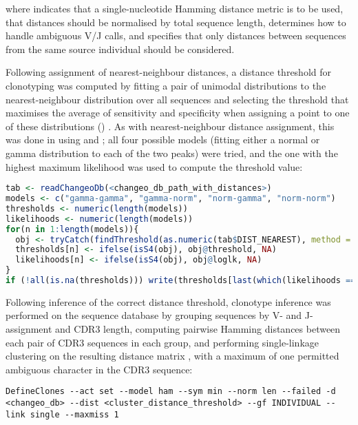 \noindent where  indicates that a single-nucleotide Hamming distance metric is to be used,  that distances should be normalised by total sequence length,  determines how to handle ambiguous V/J calls, and  specifies that only distances between sequences from the same source individual should be considered.

Following assignment of nearest-neighbour distances, a distance threshold for clonotyping was computed by fitting a pair of unimodal distributions to the nearest-neighbour distribution over all sequences and selecting the threshold that maximises the average of sensitivity and specificity when assigning a point to one of these distributions () \parencite{nouri2018threshold}. As with nearest-neighbour distance assignment, this was done in  using  and ; all four possible models (fitting either a normal or gamma distribution to each of the two peaks) were tried, and the one with the highest maximum likelihood was used to compute the threshold value:

\begin{lstlisting}[language=R]
tab <- readChangeoDb(<changeo_db_path_with_distances>)
models <- c("gamma-gamma", "gamma-norm", "norm-gamma", "norm-norm")
thresholds <- numeric(length(models))
likelihoods <- numeric(length(models))
for(n in 1:length(models)){
  obj <- tryCatch(findThreshold(as.numeric(tab$DIST_NEAREST), method = "gmm", model = "hmm", cutoff = "opt"), error = function(e) return(e$message), warning = function(w) return(w$message))
  thresholds[n] <- ifelse(isS4(obj), obj@threshold, NA)
  likelihoods[n] <- ifelse(isS4(obj), obj@loglk, NA)
}
if (!all(is.na(thresholds))) write(thresholds[last(which(likelihoods == max(likelihoods, na.rm = TRUE))], <threshold_output_path>)
\end{lstlisting} 

\noindent Following inference of the correct distance threshold, clonotype inference was performed on the sequence database by grouping sequences by V- and J-assignment and CDR3 length, computing pairwise Hamming distances between each pair of CDR3 sequences in each group, and performing single-linkage clustering on the resulting distance matrix \parencite{gupta2017hierarchical}, with a maximum of one permitted ambiguous  character in the CDR3 sequence:

\begin{lstlisting}
DefineClones --act set --model ham --sym min --norm len --failed -d <changeo_db> --dist <cluster_distance_threshold> --gf INDIVIDUAL --link single --maxmiss 1
\end{lstlisting}

